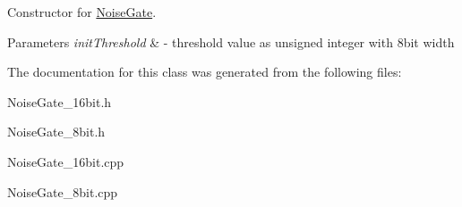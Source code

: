 Constructor for \hyperlink{classNoiseGate}{Noise\+Gate}. 
\begin{DoxyParams}{Parameters}
{\em init\+Threshold} & -\/ threshold value as unsigned integer with 8bit width \\
\hline
\end{DoxyParams}


The documentation for this class was generated from the following files\+:\begin{DoxyCompactItemize}
\item 
Noise\+Gate\+\_\+16bit.\+h\item 
Noise\+Gate\+\_\+8bit.\+h\item 
Noise\+Gate\+\_\+16bit.\+cpp\item 
Noise\+Gate\+\_\+8bit.\+cpp\end{DoxyCompactItemize}
